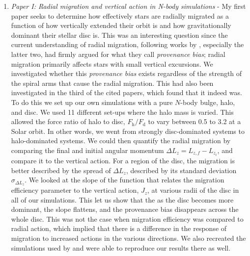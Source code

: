 \begin{enumerate}
    \item \textit{Paper I: Radial migration and vertical action in N-body simulations} - My first paper seeks to determine how effectively stars are radially migrated as a function of how vertically extended their orbit is and how gravitationally dominant their stellar disc is. This was an interesting question since the current understanding of radial migration, following works by \cite{solway:12, vera-ciro:14, vera-ciro:16b}, especially the latter two, had firmly argued for what they call \textit{provenance bias}; radial migration primarily affects stars with small vertical excursions. We investigated whether this \textit{provenance bias} exists regardless of the strength of the spiral arms that cause the radial migration. This had also been investigated in the third of the cited papers, which found that it indeed was. To do this we set up our own simulations with a pure $N$-body bulge, halo, and disc. We used 11 different set-ups where the halo mass is varied. This allowed the force ratio of halo to disc, $F_\mathrm{h}/F_\mathrm{d}$ to vary between 0.5 to 3.2 at a Solar orbit. In other words, we went from strongly disc-dominated systems to halo-dominated systems. We could then quantify the radial migration by comparing the final and initial angular momentum $\Delta L_z = L_{z,f} - L_{z_i}$, and compare it to the vertical action. For a region of the disc, the migration is better described by the spread of $\Delta L_z$, described by its standard deviation $\sigma_{\Delta L_z}$. We looked at the slope of the function that relates the migration efficiency parameter to the vertical action, $J_z$, at various radii of the disc in all of our simulations. This let us show that the as the disc becomes more dominant, the slope flattens, and the provenance bias disappears across the whole disc. This was not the case when migration efficiency was compared to radial action, which implied that there is a difference in the response of migration to increased actions in the various directions. We also recreated the simulations used by \cite{vera-ciro:16b} and were able to reproduce our results there as well.
    

\end{enumerate}
